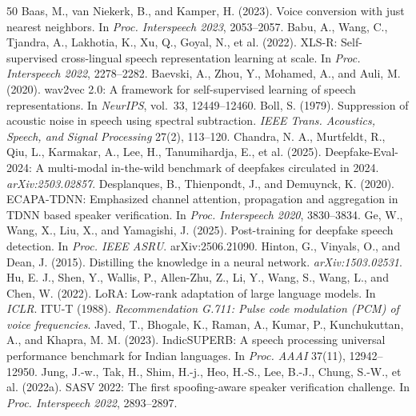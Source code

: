 \documentclass[10pt,a4paper,twocolumn]{article}
\begin{document}
{\footnotesize
\begin{thebibliography}{50}
\setlength{\itemsep}{0pt}\setlength{\parskip}{0pt}
 Baas, M., van Niekerk, B., and Kamper, H. (2023). Voice conversion with just nearest neighbors. In \emph{Proc. Interspeech 2023}, 2053--2057.
 Babu, A., Wang, C., Tjandra, A., Lakhotia, K., Xu, Q., Goyal, N., et al. (2022). XLS-R: Self-supervised cross-lingual speech representation learning at scale. In \emph{Proc. Interspeech 2022}, 2278--2282.
 Baevski, A., Zhou, Y., Mohamed, A., and Auli, M. (2020). wav2vec 2.0: A framework for self-supervised learning of speech representations. In \emph{NeurIPS}, vol.~33, 12449--12460.
 Boll, S. (1979). Suppression of acoustic noise in speech using spectral subtraction. \emph{IEEE Trans. Acoustics, Speech, and Signal Processing} 27(2), 113--120.
 Chandra, N. A., Murtfeldt, R., Qiu, L., Karmakar, A., Lee, H., Tanumihardja, E., et al. (2025). Deepfake-Eval-2024: A multi-modal in-the-wild benchmark of deepfakes circulated in 2024. \emph{arXiv:2503.02857}.
 Desplanques, B., Thienpondt, J., and Demuynck, K. (2020). ECAPA-TDNN: Emphasized channel attention, propagation and aggregation in TDNN based speaker verification. In \emph{Proc. Interspeech 2020}, 3830--3834.
 Ge, W., Wang, X., Liu, X., and Yamagishi, J. (2025). Post-training for deepfake speech detection. In \emph{Proc. IEEE ASRU}. arXiv:2506.21090.
 Hinton, G., Vinyals, O., and Dean, J. (2015). Distilling the knowledge in a neural network. \emph{arXiv:1503.02531}.
 Hu, E. J., Shen, Y., Wallis, P., Allen-Zhu, Z., Li, Y., Wang, S., Wang, L., and Chen, W. (2022). LoRA: Low-rank adaptation of large language models. In \emph{ICLR}.
 ITU-T (1988). \emph{Recommendation G.711: Pulse code modulation (PCM) of voice frequencies}.
 Javed, T., Bhogale, K., Raman, A., Kumar, P., Kunchukuttan, A., and Khapra, M. M. (2023). IndicSUPERB: A speech processing universal performance benchmark for Indian languages. In \emph{Proc. AAAI} 37(11), 12942--12950.
 Jung, J.-w., Tak, H., Shim, H.-j., Heo, H.-S., Lee, B.-J., Chung, S.-W., et al. (2022a). SASV 2022: The first spoofing-aware speaker verification challenge. In \emph{Proc. Interspeech 2022}, 2893--2897.

\end{thebibliography}}
\end{document}
